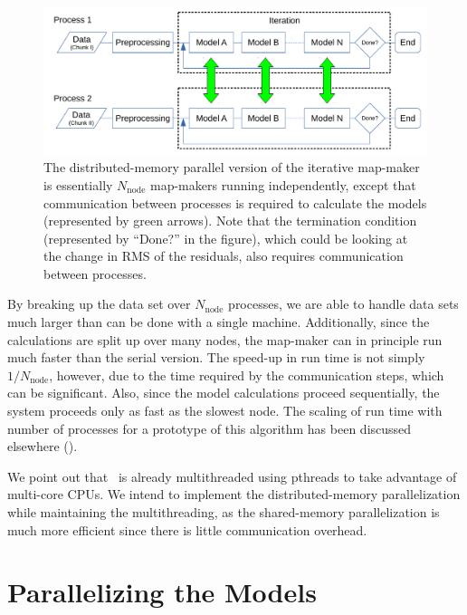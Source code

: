 \documentclass[oneside,11pt]{starlink}
\begin{document}
\begin{figure}[ht]
\begin{center}
\includegraphics[width=\textwidth]{ssn79_parallel_flowchart}
\caption[Parallel flow chart]{The distributed-memory parallel version
  of the iterative map-maker is essentially $N_\mathrm{node}$
  map-makers running independently, except that communication between
  processes is required to calculate the models (represented by green
  arrows). Note that the termination condition (represented by
  ``Done?'' in the figure), which could be looking at the change in
  RMS of the residuals, also requires communication between
  processes.}
\label{fig:parallel}
\end{center}
\end{figure}

By breaking up the data set over $N_\mathrm{node}$ processes, we are
able to handle data sets much larger than can be done with a single
machine. Additionally, since the calculations are split up over many
nodes, the map-maker can in principle run much faster than the serial
version. The speed-up in run time is not simply $1/N_\mathrm{node}$,
however, due to the time required by the communication steps, which
can be significant. Also, since the model calculations proceed
sequentially, the system proceeds only as fast as the slowest
node. The scaling of run time with number of processes for a prototype
of this algorithm has been discussed elsewhere
(\cite{jenness2014,marsden2014b}).

We point out that \makemap\ is already multithreaded using pthreads
to take advantage of multi-core CPUs. We intend to implement the
distributed-memory parallelization while maintaining the
multithreading, as the shared-memory parallelization is much more
efficient since there is little communication overhead.

\section{Parallelizing the Models\label{se:models}}
\end{document}
